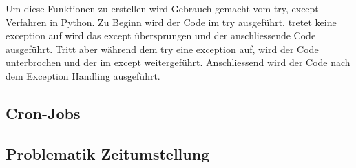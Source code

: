 Um diese Funktionen zu erstellen wird Gebrauch gemacht vom try, except Verfahren in Python. Zu Beginn wird der Code im try ausgeführt, tretet keine exception auf wird das except übersprungen und der anschliessende Code ausgeführt. Tritt aber während dem try eine exception auf, wird der Code unterbrochen und der im except weitergeführt. Anschliessend wird der Code nach dem Exception Handling ausgeführt.\cite{ThePythonTutorial8.ErrorsAndExceptions:Python}

\subsection{Cron-Jobs}
\newline


\subsection{Problematik Zeitumstellung}



